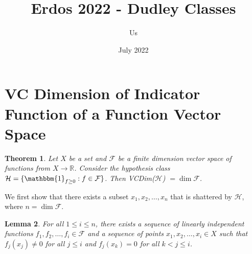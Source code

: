 \documentclass{article}
\title{Erdos 2022 - Dudley Classes}
\author{Us }
\date{July 2022}
\newtheorem{theorem}{Theorem}[section]
\newtheorem{lemma}[theorem]{Lemma}
\begin{document}
\maketitle

\section{VC Dimension of Indicator Function of a Function Vector Space}

\begin{theorem}\label{thm1.1}
Let $X$ be a set and $\mathcal{F}$ be a finite dimension vector space of functions from $X \rightarrow \mathbb{R}$. Consider the hypothesis class $\mathcal{H} = \{ \mathbbm{1}_{f \ge 0}: f \in \mathcal{F} \}$. Then VCDim($\mathcal{H}$) $= \dim \mathcal{F}$.
\end{theorem}

We first show that there exists a subset $x_1, x_2, \dots, x_n$ that is shattered by $\mathcal{H}$, where $n = \dim \mathcal{F}$. 

\begin{lemma}
For all $1 \le i \le n$, there exists a sequence of linearly independent functions $f_1, f_2, \dots, f_i \in \mathcal{F}$ and a sequence of points $x_1, x_2, \dots, x_i \in X$ such that $f_j(x_j) \neq 0$ for all $j \le i$ and $f_j(x_k) = 0$ for all $k < j \le i$. 
\end{lemma}
\end{document}

